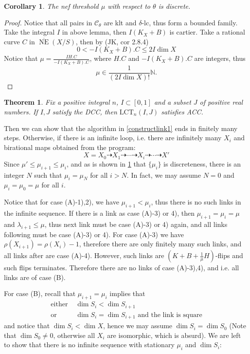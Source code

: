 \documentclass{article}
\newtheorem{thm}[defn]{Theorem}
\newtheorem{cor}[defn]{Corollary}
\begin{document}
\begin{cor}\label{Discreteness}
  The nef threshold $ \mu $ with respect to $ \theta $ is discrete.
\end{cor}
\begin{proof}
  Notice that all pairs in $ \mathcal{C}_\theta $ are klt and $ \delta $-lc, thus form a bounded family. Take the integral $ I $ in above lemma, then $ I(K_X+B) $ is cartier. Take a rational curve $ C $ in $ \overline{\operatorname{NE}}(X/S) $, then by (JK, cor 2.8.4)
  \[ 0<-I(K_X+B).C\leqslant 2I\dim X \]
  Notice that $ \mu=\frac{IH.C}{-I(K_X+B).C} $, where $ H.C $ and $ -I(K_X+B).C $ are integers, thus 
  \[ \mu\in \frac{1}{(2I\dim X)!}\mathbb{N}.  \]
\end{proof}
\begin{thm}
  Fix a positive integral $ n $, $ I\subset [0,1] $ and a subset $ J $ of positive real numbers. If $ I,J $ satisfy the DCC, then $ \mathrm{LCT}_n(I,J) $ satisfies ACC.
\end{thm}
Then we can show that the algorithm in \ref{constructlink1} ends in finitely many steps. Otherwise, if there is an infinite loop, i.e. there are infinitely many $ X_i $ and birational maps obtained from the program:
\[ X=X_0\dashrightarrow X_1\dashrightarrow \cdots\dashrightarrow X_i \dashrightarrow\cdots\dashrightarrow X'\]
Since $ \mu'\leqslant\mu_{i+1}\leqslant \mu_i $, and as is shown in \ref{Discreteness} that $ \{\mu_i\} $ is discreteness, there is an integer $ N $ such that $ \mu_i=\mu_N $ for all $ i>N $. In fact, we may assume $ N=0 $ and $ \mu_i=\mu_0=\mu $ for all $ i $. 

Notice that for case (A)-1),2), we have $ \mu_{i+1}<\mu_i $, thus there is no such links in the infinite sequence. If there is a link as case (A)-3) or 4), then $ \mu_{i+1}=\mu_i=\mu  $ and $ \lambda_{i+1}\leqslant \mu $, thus next link must be case (A)-3) or 4) again, and all links following must be case (A)-3) or 4). For case (A)-3) we have $ \rho(X_{i+1})=\rho(X_i)-1 $, therefore there are only finitely many such links, and all links after are  case (A)-4). However, such links are $ (K+B+\frac{1}{\mu}H) $-flips and such flips terminates. Therefore there are no links of case (A)-3),4), and i.e. all links are of case (B).

For case (B), recall that $ \mu_{i+1}=\mu_i $ implies that
\[
  \begin{aligned}
    \text{either } &\dim S_i<\dim S_{i+1} \\
    \text{or }&\dim S_i=\dim S_{i+1} \text{ and the link is square} 
  \end{aligned}
\]
and notice that $ \dim S_i< \dim X $, hence we may assume $ \dim S_i=\dim S_0 $ (Note that $ \dim S_0 \neq 0$, otherwise all $ X_i $ are isomorphic, which is absurd). We are left to show that there is no infinite sequence with stationary $ \mu_i $ and $ \dim S_i $:
\end{document}
